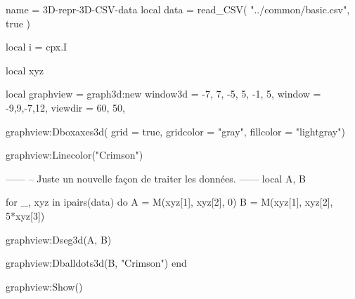 \documentclass{standalone}
\begin{document}
\begin{luadraw}{name = 3D-repr-3D-CSV-data}
local data = read_CSV(
  "../common/basic.csv",
  true
)

local i = cpx.I

local xyz

local graphview = graph3d:new{
  window3d = {-7, 7, -5, 5, -1, 5},
  window   = {-9,9,-7,12},
  viewdir = {60, 50},
}

graphview:Dboxaxes3d({
  grid      = true,
  gridcolor = "gray",
  fillcolor = "lightgray"})

graphview:Linecolor("Crimson")

------
-- Juste un nouvelle façon de traiter les données.
------
local A, B

for _, xyz in ipairs(data) do
  A = M(xyz[1], xyz[2], 0)
  B = M(xyz[1], xyz[2], 5*xyz[3])

  graphview:Dseg3d({A, B})

  graphview:Dballdots3d({B}, "Crimson")
end

graphview:Show()
\end{luadraw}
\end{document}
